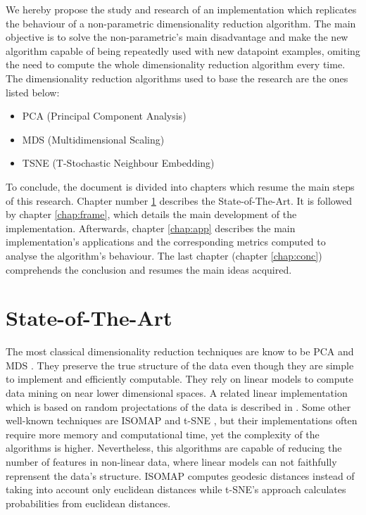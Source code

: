 \documentclass[a4paper,11pt,spanish]{report}
\begin{document}
We hereby propose the study and research of an implementation which replicates the behaviour of a non-parametric dimensionality reduction algorithm. The main objective is to solve the non-parametric's main disadvantage and make the new algorithm capable of being repeatedly used with new datapoint examples, omiting the need to compute the whole dimensionality reduction algorithm every time.\\
The dimensionality reduction algorithms used to base the research are the ones listed below:
\renewcommand{\labelitemi}{\textendash}
\begin{itemize}
\item PCA (Principal Component Analysis)
\item MDS (Multidimensional Scaling)
\item TSNE (T-Stochastic Neighbour Embedding)
\end{itemize}

To conclude, the document is divided into chapters which resume the main steps of this research. Chapter number \ref{chap:stt} describes the State-of-The-Art. It is followed by chapter \ref{chap:frame}, which details the main development of the implementation. Afterwards, chapter \ref{chap:app} describes the main implementation's applications and the corresponding metrics computed to analyse the algorithm's behaviour. The last chapter (chapter \ref{chap:conc}) comprehends the conclusion and resumes the main ideas acquired.


\chapter{State-of-The-Art}
\label{chap:stt}

The most classical dimensionality reduction techniques are know to be PCA \citep{pca} and MDS \citep{mds}. They preserve the true structure of the data even though they are simple to implement and efficiently computable. They rely on linear models to compute data mining on near lower dimensional spaces. A related linear implementation which is based on random projectations of the data is described in \citep{rproj, rproj2}. Some other well-known techniques are ISOMAP \citep{isomap} and t-SNE \citep{tsne}, but their implementations often require more memory and computational time, yet the complexity of the algorithms is higher. Nevertheless, this algorithms are capable of reducing the number of features in non-linear data, where linear models can not faithfully reprensent the data's structure. ISOMAP computes geodesic distances instead of taking into account only euclidean distances while t-SNE's approach calculates probabilities from euclidean distances.
\end{document}
